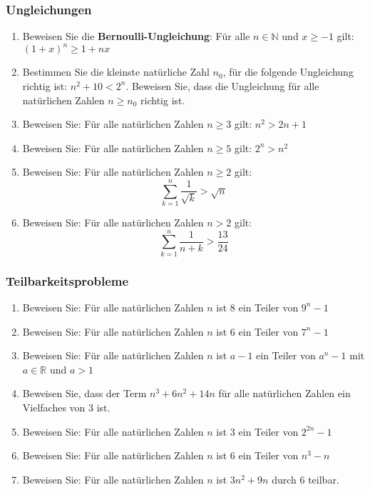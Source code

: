 \subsubsection{Ungleichungen}
\begin{enumerate}
	\item Beweisen Sie die \textbf{Bernoulli-Ungleichung}: Für alle $ n \in \mathbb{N} $ und $ x \geq -1 $ gilt: $ (1 + x)^n \geq 1 + nx $
	\item Bestimmen Sie die kleinste natürliche Zahl $ n_0 $, für die folgende Ungleichung richtig ist: $ n^2 + 10 < 2^n $. Beweisen Sie, dass die Ungleichung für alle natürlichen Zahlen $ n \geq n_0 $ richtig ist.
	\item Beweisen Sie: Für alle natürlichen Zahlen $ n \geq 3 $ gilt: $ n^2 > 2n + 1 $
	\item Beweisen Sie: Für alle natürlichen Zahlen $ n \geq 5 $ gilt: $ 2^n > n^2 $
	\item Beweisen Sie: Für alle natürlichen Zahlen $ n \geq 2 $ gilt:
		\[\sum_{k=1}^n \frac{1}{\sqrt{k}} > \sqrt{n} \]
	\item Beweisen Sie: Für alle natürlichen Zahlen $ n > 2 $ gilt:
		\[\sum_{k=1}^n \frac{1}{n+k} > \frac{13}{24} \]
\end{enumerate}
\subsubsection{Teilbarkeitsprobleme}
\begin{enumerate}
	\item Beweisen Sie: Für alle natürlichen Zahlen $ n $ ist $ 8 $ ein Teiler von $ 9^n - 1 $
	\item Beweisen Sie: Für alle natürlichen Zahlen $ n $ ist $ 6 $ ein Teiler von $ 7^n - 1 $
	\item Beweisen Sie: Für alle natürlichen Zahlen $ n $ ist $ a - 1 $ ein Teiler von $ a^n - 1 $ mit $ a \in \mathbb{R} $ und $ a > 1 $
	\item Beweisen Sie, dass der Term $ n^3 + 6n^2 + 14n $ für alle natürlichen Zahlen ein Vielfaches von $ 3 $ ist.
	\item Beweisen Sie: Für alle natürlichen Zahlen $ n $ ist $ 3 $ ein Teiler von $ 2^{2n} - 1 $
	\item Beweisen Sie: Für alle natürlichen Zahlen $ n $ ist $ 6 $ ein Teiler von $ n^3 - n $
	\item Beweisen Sie: Für alle natürlichen Zahlen $ n $ ist $ 3n^2 + 9n $ durch $ 6 $ teilbar.
\end{enumerate}
